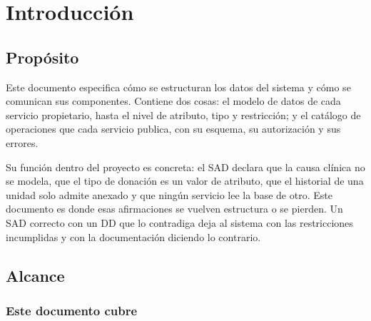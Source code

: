 \documentclass[11pt,a4paper]{article}
\begin{document}
\newpage

\tableofcontents
\newpage
\listoffigures
\vspace{0.8cm}
\listoftables
\newpage

\section{Introducción}

\subsection{Propósito}

Este documento especifica cómo se estructuran los datos del sistema y cómo se comunican sus componentes. Contiene dos cosas: el modelo de datos de cada servicio propietario, hasta el nivel de atributo, tipo y restricción; y el catálogo de operaciones que cada servicio publica, con su esquema, su autorización y sus errores.

Su función dentro del proyecto es concreta: el SAD declara que la causa clínica no se modela, que el tipo de donación es un valor de atributo, que el historial de una unidad solo admite anexado y que ningún servicio lee la base de otro. Este documento es donde esas afirmaciones se vuelven estructura o se pierden. Un SAD correcto con un DD que lo contradiga deja al sistema con las restricciones incumplidas y con la documentación diciendo lo contrario.

\subsection{Alcance}

\subsubsection*{Este documento cubre}
\end{document}
